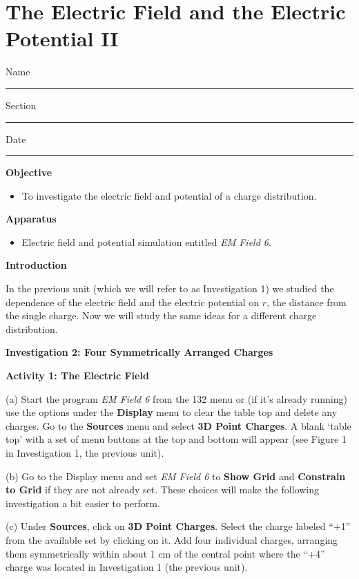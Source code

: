 
\section{The Electric Field and the Electric Potential II}

Name \rule{2.0in}{0.1pt}\hfill{}Section \rule{1.0in}{0.1pt}\hfill{}Date
\rule{1.0in}{0.1pt}

\textbf{Objective}

\begin{itemize}
\item To investigate the electric field and potential of a charge distribution.
\end{itemize}

\textbf{Apparatus}

\begin{itemize}
\item Electric field and potential simulation entitled {\it EM Field 6}.
\end{itemize}

\textbf{Introduction}

In the previous unit (which we will refer to as Investigation 1) we studied the dependence
of the electric field and the electric potential on $r$, the distance from the
single charge.
Now we will study the same ideas for a different charge distribution.

\textbf{Investigation 2: Four Symmetrically Arranged Charges}

\textbf{Activity 1: The Electric Field}

(a) Start the program {\it EM Field 6} from the 132 menu or (if it's already running)
use the options under the 
\textbf{Display} menu to clear the table top and delete any charges.
Go to the \textbf{Sources} menu and select \textbf{3D Point Charges}.
A blank `table top' with a set of menu 
buttons at the top and bottom will appear (see Figure 1 in Investigation 1, the previous unit).

(b) Go to the Display menu and set {\it EM Field 6} to
{\bf Show Grid} and {\bf Constrain to Grid} if they are not already set.
These choices will make the following investigation a bit easier to perform.

(c) Under \textbf{Sources}, click on \textbf{3D Point Charges}. Select the
charge labeled {}``+1'' from the available set by clicking on it.
Add four individual charges, arranging them symmetrically within about
1 cm of the central point where the {}``+4'' charge was located
in Investigation 1 (the previous unit). 

